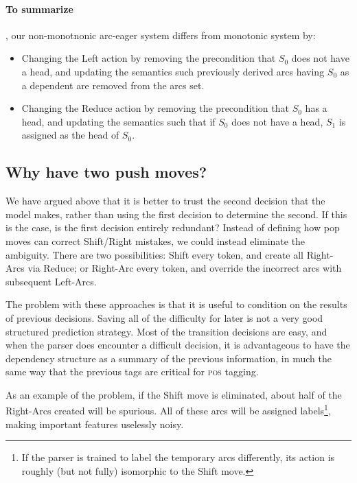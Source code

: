 \documentclass[11pt,letterpaper]{article}
\newcommand{\pos}{\textsc{pos}\xspace}
\begin{document}
\noindent\paragraph{To summarize}, our non-monotnonic arc-eager system differs from
monotonic system by:
\begin{itemize}
   \item Changing the Left action by removing the precondition that $S_0$
   does not have a head, and updating the semantics such previously
   derived arcs having $S_0$ as a dependent are removed from the arcs set.

   \item Changing the Reduce action by removing the precondition that $S_0$
   has a head, and updating the semantics such that if $S_0$ does not have
   a head, $S_1$ is assigned as the head of $S_0$.
\end{itemize}




\subsection{Why have two push moves?}

We have argued above that it is better to trust the second decision that the model
makes, rather than using the first decision to determine the second. If this is
the case, is the first decision entirely redundant?
Instead of defining how pop moves can correct Shift/Right mistakes, we could
instead eliminate the ambiguity. There are two possibilities:
Shift every token, and create all Right-Arcs via Reduce; or Right-Arc every token,
and override the incorrect arcs with subsequent Left-Arcs.

The problem with these approaches is that it is useful to condition
on the results of previous decisions. Saving all of the difficulty for later
is not a very good structured prediction strategy. Most of the transition decisions are
easy, and when the parser does encounter a difficult decision, it is advantageous
to have the dependency structure as a summary of the previous information, in
much the same way that the previous tags are critical for \pos tagging. 

As an example of the problem, if the Shift move is
eliminated, about half of the Right-Arcs created will be spurious. All of these
arcs will be assigned labels\footnote{If the parser is trained to label the temporary
arcs differently, its action is roughly (but not fully) isomorphic to the Shift move.},
making important features uselessly noisy.
\end{document}
